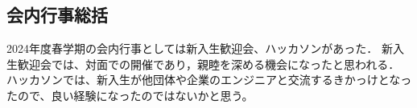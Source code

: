 \subsection*{会内行事総括}


2024年度春学期の会内行事としては新入生歓迎会、ハッカソンがあった．
新入生歓迎会では、対面での開催であり，親睦を深める機会になったと思われる．
ハッカソンでは、新入生が他団体や企業のエンジニアと交流するきかっけとなったので、良い経験になったのではないかと思う。

